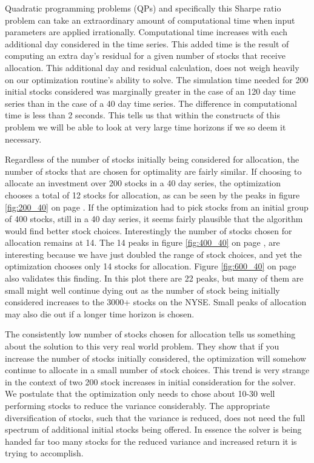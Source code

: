 Quadratic programming problems (QPs) and specifically this Sharpe ratio problem can take an extraordinary amount of computational time when input parameters are applied irrationally. Computational time increases with each additional day considered in the time series.  This added time is the result of computing an extra day's residual for a given number of stocks that receive allocation.  This additional day and residual calculation, does not weigh heavily on our optimization routine's ability to solve.  The simulation time needed for 200 initial stocks considered was marginally greater in the case of an 120 day time series than in the case of a 40 day time series.  The difference in computational time is less than 2 seconds.  This tells us that within the constructs of this problem we will be able to look at  very large time horizons if we so deem it necessary.  

Regardless of the number of stocks initially being considered for allocation, the number of stocks that are chosen for optimality are fairly similar.  If choosing to allocate an investment over 200 stocks in a 40 day series, the optimization chooses a total of 12 stocks for allocation, as can be seen by the peaks in figure \ref{fig:200_40} on page \pageref{fig:200_40}.  If the optimization had to pick stocks from an initial group of 400 stocks, still in a 40 day series, it seems fairly plausible that the algorithm would find better stock choices.  Interestingly the number of stocks chosen for allocation remains at 14.  The 14 peaks in figure \ref{fig:400_40} on page \pageref{fig:400_40}, are interesting because we have just doubled the range of stock choices, and yet the optimization chooses only 14 stocks for allocation. Figure \ref{fig:600_40} on page \pageref{fig:600_40} also validates this finding.  In this plot there are 22 peaks, but many of them are small might well continue dying out as the number of stock being initially considered increases to the 3000+ stocks on the NYSE.  Small peaks of allocation may also die out if a longer time horizon is chosen.  

The consistently low number of stocks chosen for allocation tells us something about the solution to this very real world problem.  They show that if you increase the number of stocks initially considered, the optimization will somehow continue to allocate in a small number of stock choices.  This trend is very strange in the context of two 200 stock increases in initial consideration for the solver.  We postulate that the optimization only needs to chose about 10-30 well performing stocks to reduce the variance considerably.  The appropriate diversification of stocks, such that the variance is reduced, does not need the full spectrum of additional initial stocks being offered.  In essence the solver is being handed far too many stocks for the reduced variance and increased return it is trying to accomplish.  

